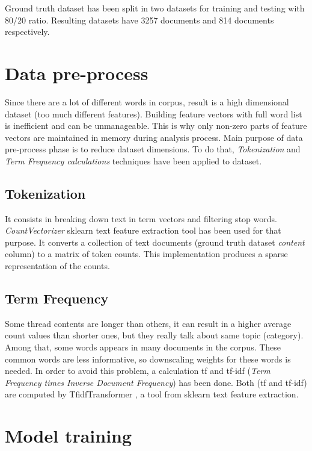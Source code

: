 Ground truth dataset has been split in two datasets for training and testing with 80/20 ratio. Resulting datasets have 3257 documents and 814 documents respectively.

\section{Data pre-process}

Since there are a lot of different words in corpus, result is a high dimensional dataset (too much different features). Building feature vectors with full word list is inefficient and can be unmanageable. This is why only non-zero parts of feature vectors are maintained in memory during analysis process. Main purpose of data pre-process phase is to reduce dataset dimensions. To do that, \textit{Tokenization} and \textit{Term Frequency calculations} techniques have been applied to dataset.

\subsection{Tokenization}

It consists in breaking down text in term vectors and filtering stop words. \textit{CountVectorizer} \cite{CountVectorizer} sklearn text feature extraction tool has been used for that purpose. It converts a collection of text documents (ground truth dataset \textit{content} column) to a matrix of token counts. This implementation produces a sparse representation of the counts.

\subsection{Term Frequency}

Some thread contents are longer than others, it can result in a higher average count values than shorter ones, but they really talk about same topic (category). Among that, some words appears in many documents in the corpus. These common words are less informative, so downscaling weights for these words is needed. In order to avoid this problem, a calculation tf and tf-idf (\textit{Term Frequency times Inverse Document Frequency}) has been done. Both (tf and tf-idf) are computed by TfidfTransformer \cite{TfidfTransformer}, a tool from sklearn text feature extraction.

\section{Model training}
\label{sec:training}

